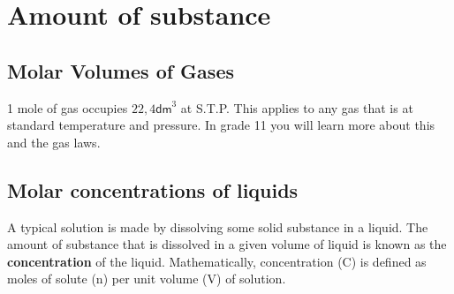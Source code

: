 \section{Amount of substance}
            \subsection*{Molar Volumes of Gases}
            \nopagebreak
            \par
            \label{m38712*eip-id1168064596799}
  { \label{m38712*eip-id1168053572222}1 mole of gas occupies $22,4{\mathsf{dm}}^{3}$ at S.T.P. } 
      \label{m38712*id282112}This applies to any gas that is at standard temperature and pressure. In grade 11 you will learn more about this and the gas laws.\par 
    \label{m38712*cid8}
            \subsection*{Molar concentrations of liquids}
            \nopagebreak
      \label{m38712*id282848}A typical solution is made by dissolving some solid substance in a liquid. The amount of substance that is dissolved in a given volume of liquid is known as the \textbf{concentration} of the liquid. Mathematically, concentration (C) is defined as moles of solute (n) per unit volume (V) of solution.\par 
      \label{m38712*id282860}\nopagebreak\noindent{}
        
